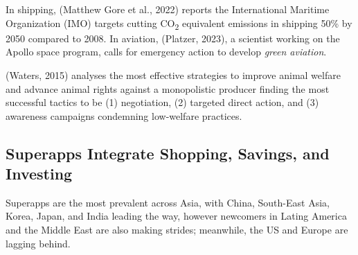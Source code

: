 \documentclass[
  12pt,
  letterpaper,
  DIV=11,
  numbers=noendperiod]{scrartcl}
\begin{document}
\let\pandoctableshortcapt\relax

In shipping, (Matthew Gore et al., 2022) reports the International
Maritime Organization (IMO) targets cutting CO\textsubscript{2}
equivalent emissions in shipping 50\% by 2050 compared to 2008. In
aviation, (Platzer, 2023), a scientist working on the Apollo space
program, calls for emergency action to develop \emph{green aviation}.

(Waters, 2015) analyses the most effective strategies to improve animal
welfare and advance animal rights against a monopolistic producer
finding the most successful tactics to be (1) negotiation, (2) targeted
direct action, and (3) awareness campaigns condemning low-welfare
practices.

\subsection{Superapps Integrate Shopping, Savings, and
Investing}\label{superapps-integrate-shopping-savings-and-investing}

Superapps are the most prevalent across Asia, with China, South-East
Asia, Korea, Japan, and India leading the way, however newcomers in
Lating America and the Middle East are also making strides; meanwhile,
the US and Europe are lagging behind.

\def\pandoctableshortcapt{Global Overview of Superapps}
\end{document}
